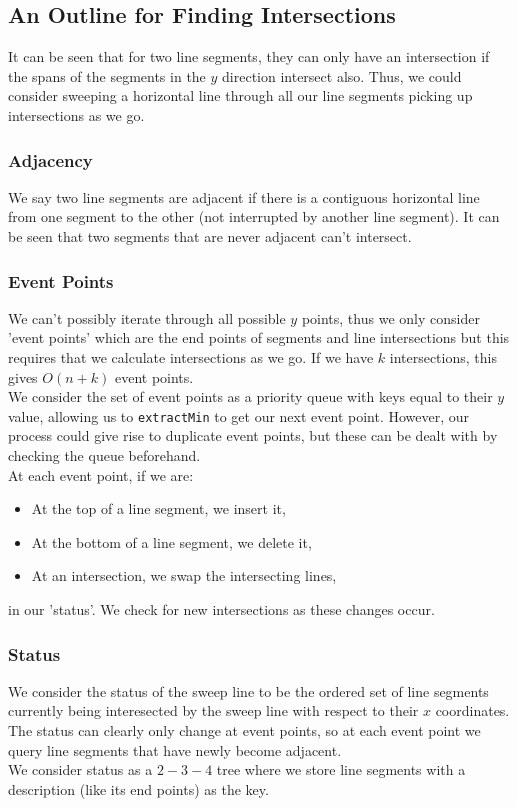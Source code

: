 \newpage

\subsection{An Outline for Finding Intersections}

It can be seen that for two line segments, they can only have an intersection
if the spans of the segments in the $y$ direction intersect also. Thus,
we could consider sweeping a horizontal line through all our line segments
picking up intersections as we go.

\subsubsection{Adjacency} 
We say two line segments are adjacent if there is a
contiguous horizontal line from one segment to the other (not interrupted
by another line segment). It can be
seen that two segments that are never adjacent can't intersect.

\subsubsection{Event Points} 
We can't possibly iterate through all possible $y$
points, thus we only consider 'event points' which are the end points of 
segments and line intersections but this requires that we calculate 
intersections as we go. If we have $k$ intersections,
this gives $O(n + k)$ event points.
\\[\baselineskip]
We consider the set of event points as a priority queue with keys 
equal to their $y$ value, allowing us to \texttt{extractMin} to get
our next event point. However, our process could give rise to duplicate
event points, but these can be dealt with by checking the queue beforehand.
\\[\baselineskip]
At each event point, if we are: \begin{itemize}
  \item At the top of a line segment, we insert it,
  \item At the bottom of a line segment, we delete it,
  \item At an intersection, we swap the intersecting lines,
\end{itemize} in our 'status'. We check for new intersections as these changes occur.

\subsubsection{Status} 
We consider the status of the sweep line to be the
ordered set of line segments currently being interesected by the sweep line
with respect to their $x$ coordinates. The status can clearly only change
at event points, so at each event point we query line segments that have
newly become adjacent.
\\[\baselineskip]
We consider status as a $2-3-4$ tree where we store line segments with a
description (like its end points) as the key.
  

